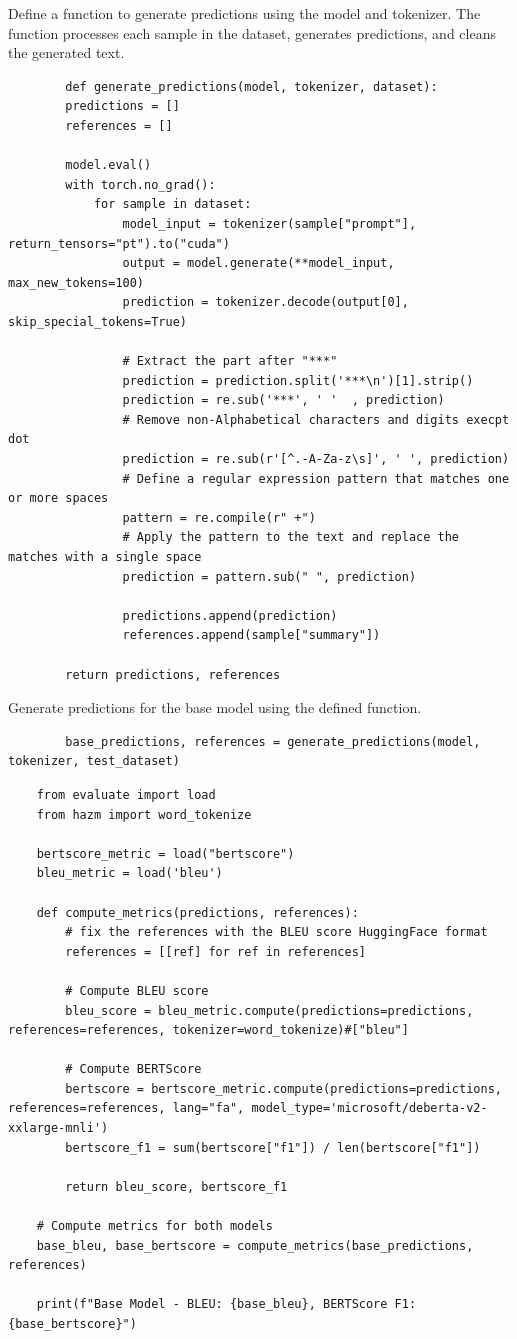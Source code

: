 \documentclass{solutionclass} %
\begin{document}
\begin{solution}
	Define a function to generate predictions using the model and tokenizer. The function processes each sample in the dataset, generates predictions, and cleans the generated text.
	\begin{lstlisting}
		def generate_predictions(model, tokenizer, dataset):
		predictions = []
		references = []
	
		model.eval()
		with torch.no_grad():
			for sample in dataset:
				model_input = tokenizer(sample["prompt"], return_tensors="pt").to("cuda")
				output = model.generate(**model_input, max_new_tokens=100)
				prediction = tokenizer.decode(output[0], skip_special_tokens=True)
			
				# Extract the part after "***"
				prediction = prediction.split('***\n')[1].strip()
				prediction = re.sub('***', ' '  , prediction)
				# Remove non-Alphabetical characters and digits execpt dot
				prediction = re.sub(r'[^.-A-Za-z\s]', ' ', prediction)
				# Define a regular expression pattern that matches one or more spaces
				pattern = re.compile(r" +")
				# Apply the pattern to the text and replace the matches with a single space
				prediction = pattern.sub(" ", prediction)
				
				predictions.append(prediction)
				references.append(sample["summary"])
	
		return predictions, references
	\end{lstlisting}
\end{solution}

\begin{solution}
	Generate predictions for the base model using the defined function.
	\begin{lstlisting}
		base_predictions, references = generate_predictions(model, tokenizer, test_dataset)
	\end{lstlisting}
\end{solution}

\begin{lstlisting}
	from evaluate import load
	from hazm import word_tokenize
	
	bertscore_metric = load("bertscore")
	bleu_metric = load('bleu')
	
	def compute_metrics(predictions, references):
		# fix the references with the BLEU score HuggingFace format
		references = [[ref] for ref in references]
	
		# Compute BLEU score
		bleu_score = bleu_metric.compute(predictions=predictions, references=references, tokenizer=word_tokenize)#["bleu"]
	
		# Compute BERTScore
		bertscore = bertscore_metric.compute(predictions=predictions, references=references, lang="fa", model_type='microsoft/deberta-v2-xxlarge-mnli')
		bertscore_f1 = sum(bertscore["f1"]) / len(bertscore["f1"])
	
		return bleu_score, bertscore_f1
	
	# Compute metrics for both models
	base_bleu, base_bertscore = compute_metrics(base_predictions, references)
	
	print(f"Base Model - BLEU: {base_bleu}, BERTScore F1: {base_bertscore}")
\end{lstlisting}
\end{document}
